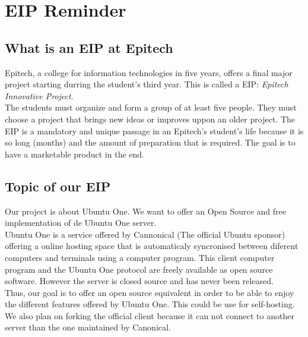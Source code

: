 \documentclass[12pt]{report}
\begin{document}
\tableofcontents
{}
\thispagestyle{empty}

\chapter{EIP Reminder}
\setcounter{page}{1} %

\section{What is an EIP at Epitech}
Epitech, a college for information technologies in five years, offers a final major project starting durring the student's third year. This is called a EIP: \emph{Epitech Innovative Project}.\\

The students must organize and form a group of at least five people. They must choose a project that brings new ideas or improves uppon an older project. The EIP is a mandatory and unique passage in an Epitech's student's life because it is so long (months) and the amount of preparation that is required. The goal is to have a marketable product in the end.\\

\section{Topic of our EIP}

Our project is about Ubuntu One. We want to offer an Open Source and free implementation of de Ubuntu One server.\\

Ubuntu One is a service offered by Cannonical (The official Ubuntu sponsor) offering a online hosting space that is automaticaly syncronised between diferent computers and terminals using a computer program. This client computer program and the Ubuntu One protocol are freely available as open source software. However the server is closed source and has never been released.\\

Thus, our goal is to offer an open source equivalent in order to be able to enjoy the different features offered by Ubuntu One. This could be use for self-hosting.\\

We also plan on forking the official client because it can not connect to another server than the one maintained by Canonical.\\
\end{document}
